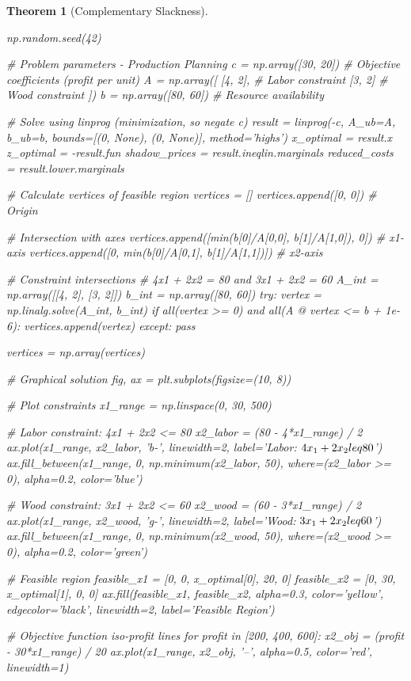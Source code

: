 \documentclass[a4paper, 11pt]{article}
\newtheorem{theorem}{Theorem}[section]
\begin{document}
\begin{theorem}[Complementary Slackness]
\begin{pycode}
np.random.seed(42)

# Problem parameters - Production Planning
c = np.array([30, 20])  # Objective coefficients (profit per unit)
A = np.array([
    [4, 2],  # Labor constraint
    [3, 2]   # Wood constraint
])
b = np.array([80, 60])  # Resource availability

# Solve using linprog (minimization, so negate c)
result = linprog(-c, A_ub=A, b_ub=b, bounds=[(0, None), (0, None)], method='highs')
x_optimal = result.x
z_optimal = -result.fun
shadow_prices = result.ineqlin.marginals
reduced_costs = result.lower.marginals

# Calculate vertices of feasible region
vertices = []
vertices.append([0, 0])  # Origin

# Intersection with axes
vertices.append([min(b[0]/A[0,0], b[1]/A[1,0]), 0])  # x1-axis
vertices.append([0, min(b[0]/A[0,1], b[1]/A[1,1])])  # x2-axis

# Constraint intersections
# 4x1 + 2x2 = 80 and 3x1 + 2x2 = 60
A_int = np.array([[4, 2], [3, 2]])
b_int = np.array([80, 60])
try:
    vertex = np.linalg.solve(A_int, b_int)
    if all(vertex >= 0) and all(A @ vertex <= b + 1e-6):
        vertices.append(vertex)
except:
    pass

vertices = np.array(vertices)

# Graphical solution
fig, ax = plt.subplots(figsize=(10, 8))

# Plot constraints
x1_range = np.linspace(0, 30, 500)

# Labor constraint: 4x1 + 2x2 <= 80
x2_labor = (80 - 4*x1_range) / 2
ax.plot(x1_range, x2_labor, 'b-', linewidth=2, label='Labor: $4x_1 + 2x_2 \\leq 80$')
ax.fill_between(x1_range, 0, np.minimum(x2_labor, 50), where=(x2_labor >= 0),
                alpha=0.2, color='blue')

# Wood constraint: 3x1 + 2x2 <= 60
x2_wood = (60 - 3*x1_range) / 2
ax.plot(x1_range, x2_wood, 'g-', linewidth=2, label='Wood: $3x_1 + 2x_2 \\leq 60$')
ax.fill_between(x1_range, 0, np.minimum(x2_wood, 50), where=(x2_wood >= 0),
                alpha=0.2, color='green')

# Feasible region
feasible_x1 = [0, 0, x_optimal[0], 20, 0]
feasible_x2 = [0, 30, x_optimal[1], 0, 0]
ax.fill(feasible_x1, feasible_x2, alpha=0.3, color='yellow',
        edgecolor='black', linewidth=2, label='Feasible Region')

# Objective function iso-profit lines
for profit in [200, 400, 600]:
    x2_obj = (profit - 30*x1_range) / 20
    ax.plot(x1_range, x2_obj, '--', alpha=0.5, color='red', linewidth=1)


\end{pycode}
\end{theorem}
\end{document}
